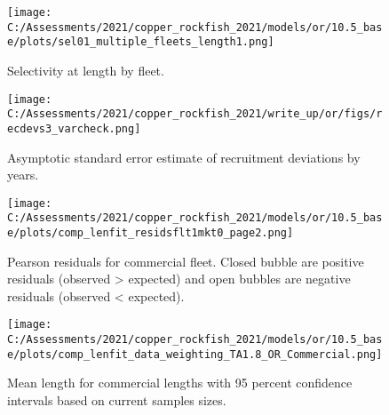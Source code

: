 \documentclass[11pt,
  english,
  a4paper,
]{article}
\begin{document}
\tagmcend\tagstructend


\begin{figure}
\centering
\texttt{[image: C:/Assessments/2021/copper\_rockfish\_2021/models/or/10.5\_base/plots/sel01\_multiple\_fleets\_length1.png]}
\caption{Selectivity at length by fleet.\label{fig:selex}}
\end{figure}

\tagmcend\tagstructend

\clearpage


\begin{figure}
\centering
\texttt{[image: C:/Assessments/2021/copper\_rockfish\_2021/write\_up/or/figs/recdevs3\_varcheck.png]}
\caption{Asymptotic standard error estimate of recruitment deviations by years.\label{fig:rec-devs-se}}
\end{figure}

\tagmcend\tagstructend


\begin{figure}
\centering
\texttt{[image: C:/Assessments/2021/copper\_rockfish\_2021/models/or/10.5\_base/plots/comp\_lenfit\_residsflt1mkt0\_page2.png]}
\caption{Pearson residuals for commercial fleet. Closed bubble are positive residuals (observed \textgreater{} expected) and open bubbles are negative residuals (observed \textless{} expected).\label{fig:com-pearson}}
\end{figure}

\tagmcend\tagstructend


\begin{figure}
\centering
\texttt{[image: C:/Assessments/2021/copper\_rockfish\_2021/models/or/10.5\_base/plots/comp\_lenfit\_data\_weighting\_TA1.8\_OR\_Commercial.png]}
\caption{Mean length for commercial lengths with 95 percent confidence intervals based on current samples sizes.\label{fig:com-mean-len-fit}}
\end{figure}
\end{document}
